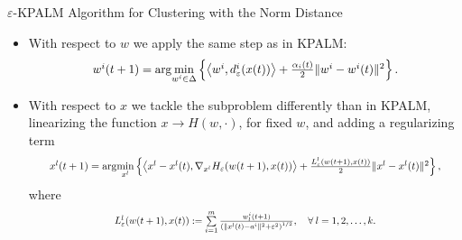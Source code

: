 \documentclass[9pt]{beamer}
\begin{document}
	\begin{frame}{$\varepsilon$-KPALM Algorithm for Clustering with the Norm Distance}
		\begin{itemize}[<+->]
			\item With respect to $w$ we apply the same step as in KPALM:
			\begin{equation*}
				\resizebox{.7\hsize}{!}{$w^i(t+1) = \arg\!\min\limits_{w^i \in \Delta} \left\lbrace \left\langle w^i, d^i_{\varepsilon}(x(t)) \right\rangle + \frac{\alpha_i(t)}{2} \|w^i -w^i(t)\|^2 \right\rbrace.$}		
			\end{equation*}
			\item With respect to $x$ we tackle the subproblem differently than in KPALM, linearizing the function $x \rightarrow H(w,\cdot)$, for fixed $w$, and adding a regularizing term
			\begin{equation*}
				\resizebox{.9\textwidth}{!}{$x^l(t+1) = \arg\!\min\limits_{x^l} \left\lbrace \left\langle x^l - x^l(t) , \nabla_{x^l}H_{\varepsilon}(w(t+1),x(t)) \right\rangle + \frac{L^l_{\varepsilon}(w(t+1),x(t))}{2} \|x^l - x^l(t)\|^2 \right\rbrace,$}
			\end{equation*}
			where
			\begin{equation*}
				\resizebox{.6\hsize}{!}{$L^l_{\varepsilon}(w(t+1),x(t)) := \sum\limits_{i=1}^{m} \frac{w^i_l(t+1)}{\left( \|x^l(t)-a^i\|^2 + {\varepsilon}^2 \right)^{1/2}}, \quad \forall \: l=1,2, \ldots, k.$}
			\end{equation*}
			\end{itemize}
			\pause
			\begin{center}
       		\end{center}
	\end{frame}
	
\end{document}
